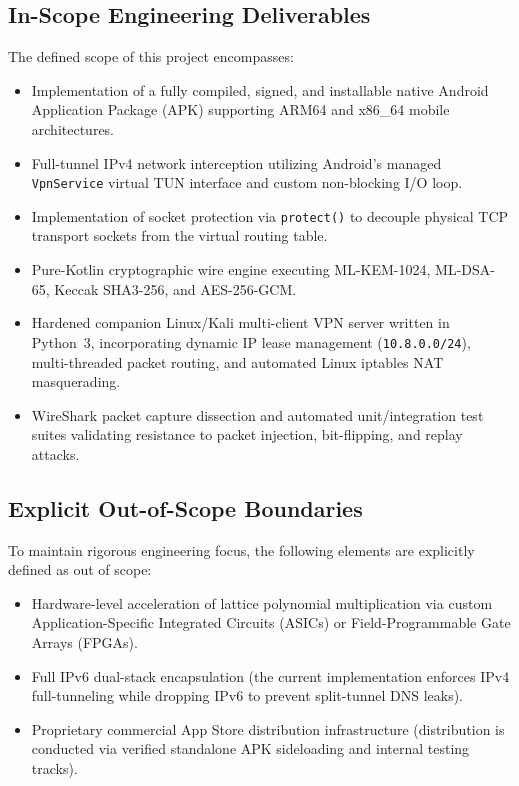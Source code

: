 \subsection{In-Scope Engineering Deliverables}
The defined scope of this project encompasses:
\begin{itemize}
    \item Implementation of a fully compiled, signed, and installable native Android Application Package (APK) supporting ARM64 and x86\_64 mobile architectures.
    \item Full-tunnel IPv4 network interception utilizing Android's managed \texttt{VpnService} virtual TUN interface and custom non-blocking I/O loop.
    \item Implementation of socket protection via \texttt{protect()} to decouple physical TCP transport sockets from the virtual routing table.
    \item Pure-Kotlin cryptographic wire engine executing ML-KEM-1024, ML-DSA-65, Keccak SHA3-256, and AES-256-GCM.
    \item Hardened companion Linux/Kali multi-client VPN server written in Python~3, incorporating dynamic IP lease management (\texttt{10.8.0.0/24}), multi-threaded packet routing, and automated Linux iptables NAT masquerading.
    \item WireShark packet capture dissection and automated unit/integration test suites validating resistance to packet injection, bit-flipping, and replay attacks.
\end{itemize}

\subsection{Explicit Out-of-Scope Boundaries}
To maintain rigorous engineering focus, the following elements are explicitly defined as out of scope:
\begin{itemize}
    \item Hardware-level acceleration of lattice polynomial multiplication via custom Application-Specific Integrated Circuits (ASICs) or Field-Programmable Gate Arrays (FPGAs).
    \item Full IPv6 dual-stack encapsulation (the current implementation enforces IPv4 full-tunneling while dropping IPv6 to prevent split-tunnel DNS leaks).
    \item Proprietary commercial App Store distribution infrastructure (distribution is conducted via verified standalone APK sideloading and internal testing tracks).
\end{itemize}


